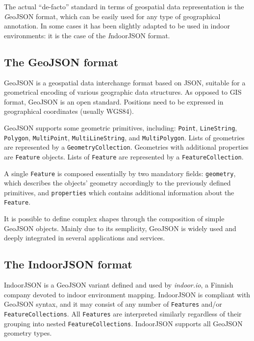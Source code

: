 The actual ``de-facto'' standard in terms of geospatial data representation is
the {\emph GeoJSON} format, which can be easily used for any type of geographical
annotation. In some cases it has been slightly adapted to be used in indoor
environments: it is the case of the {\emph IndoorJSON} format.

\subsection{The GeoJSON format}\label{the-geojson-format}

GeoJSON is a geospatial data interchange format based on JSON, suitable for a
geometrical encoding of various geographic data structures. As opposed to GIS
format, GeoJSON is an open standard. Positions need to be expressed in
geographical coordinates (usually WGS84).

GeoJSON supports some geometric primitives, including: \texttt{Point},
\texttt{Line\-String}, \texttt{Polygon}, \texttt{MultiPoint},
\texttt{MultiLineString}, and \texttt{MultiPolygon}. Lists of geometries are
represented by a \texttt{GeometryCollection}. Geometries with additional
properties are \texttt{Feature} objects. Lists of \texttt{Feature} are
represented by a \texttt{FeatureCollection}.

A single \texttt{Feature} is composed essentially by two mandatory fields:
\texttt{geometry}, which describes the objects' geometry accordingly to the
previously defined primitives, and \texttt{properties} which contains
additional information about the \texttt{Feature}.

It is possible to define complex shapes through the composition of simple
GeoJSON objects. Mainly due to its semplicity, GeoJSON is widely used and
deeply integrated in several applications and services.

\subsection{The IndoorJSON format}\label{experiences-on-indoor-json}

IndoorJSON is a GeoJSON variant defined and used by \emph{indoor.io}, a
Finnish company devoted to indoor environment mapping. IndoorJSON is compliant
with GeoJSON syntax, and it may consist of any number of \texttt{Features}
and/or \texttt{FeatureCollections}. All \texttt{Features} are interpreted
similarly regardless of their grouping into nested
\texttt{FeatureCollections}. IndoorJSON supports all GeoJSON geometry types.

